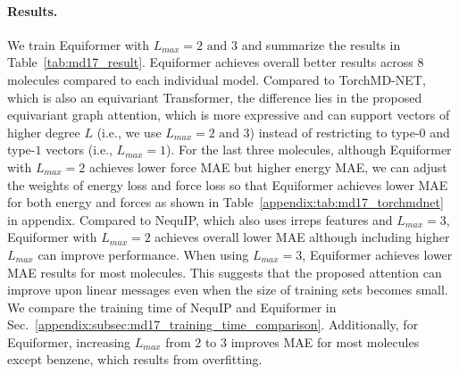 \vspace{-3.25mm}
\paragraph{Results.}
We train Equiformer with $L_{max} = 2 \text{ and } 3$ and summarize the results in Table~\ref{tab:md17_result}.
Equiformer achieves overall better results across 8 molecules compared to each individual model.
Compared to TorchMD-NET, which is also an equivariant Transformer, the difference lies in the proposed equivariant graph attention, which is more expressive and can support vectors of higher degree $L$ (i.e., we use $L_{max} = 2 \text{ and } 3$) instead of restricting to type-$0$ and type-$1$ vectors (i.e., $L_{max} = 1$).
For the last three molecules, although Equiformer with $L_{max} = 2$ achieves lower force MAE but higher energy MAE, we can adjust the weights of energy loss and force loss so that Equiformer achieves lower MAE for both energy and forces as shown in Table~\ref{appendix:tab:md17_torchmdnet} in appendix.
Compared to NequIP, which also uses irreps features and $L_{max} = 3$, Equiformer with $L_{max} = 2$ achieves overall lower MAE although including higher $L_{max}$ can improve performance.
When using $L_{max} = 3$, Equiformer achieves lower MAE results for most molecules.
This suggests that the proposed attention can improve upon linear messages even when the size of training sets becomes small.
We compare the training time of NequIP and Equiformer in Sec.~\ref{appendix:subsec:md17_training_time_comparison}.
Additionally, for Equiformer, increasing $L_{max}$ from $2$ to $3$ improves MAE for most molecules except benzene, which results from overfitting.


